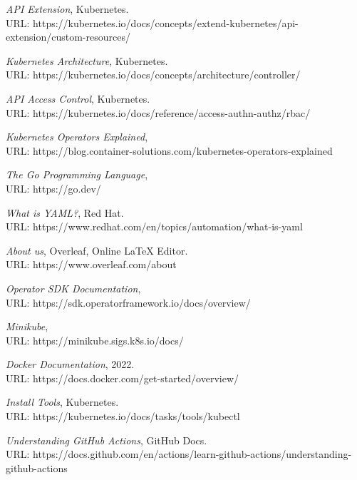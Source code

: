 \documentclass{article}
\begin{document}
\begin{thebibliography}{9}
\emph{API Extension}, Kubernetes. \\URL: https://kubernetes.io/docs/concepts/extend-kubernetes/api-extension/custom-resources/ 
  
\emph{Kubernetes Architecture}, Kubernetes. \\URL: https://kubernetes.io/docs/concepts/architecture/controller/ 
  
\emph{API Access Control}, Kubernetes. \\ URL: https://kubernetes.io/docs/reference/access-authn-authz/rbac/  

\emph{Kubernetes Operators Explained}, \\URL: https://blog.container-solutions.com/kubernetes-operators-explained
  
\emph{The Go Programming Language}, \\URL: https://go.dev/

\emph{What is YAML?}, Red Hat. \\URL: https://www.redhat.com/en/topics/automation/what-is-yaml

\emph{About us}, Overleaf, Online LaTeX Editor. \\URL: https://www.overleaf.com/about 

\emph{Operator SDK Documentation},\\ URL: https://sdk.operatorframework.io/docs/overview/

\emph{Minikube}, \\URL: https://minikube.sigs.k8s.io/docs/

\emph{Docker Documentation}, 2022. \\URL: https://docs.docker.com/get-started/overview/
  
\emph{Install Tools}, Kubernetes. \\URL: https://kubernetes.io/docs/tasks/tools/kubectl

\emph{Understanding GitHub Actions}, GitHub Docs. \\URL: https://docs.github.com/en/actions/learn-github-actions/understanding-github-actions
  

\end{thebibliography}
\end{document}
